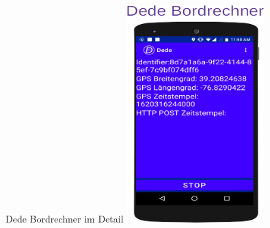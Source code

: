 \begin{frame}{Dede Bordrechner im Detail}
  \center\includegraphics[width=0.4\textwidth]{dede/dede-on-board-computer-only-june-04.png}
\end{frame}

